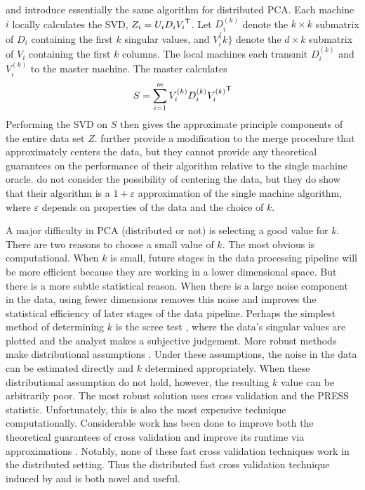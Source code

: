 \documentclass[thesis.tex]{subfiles}
\begin{document}
\cite{qu2002principal} and \cite{liang2013distributed} introduce essentially the same algorithm for distributed PCA.
Each machine $i$ locally calculates the SVD, $Z_i = U_i D_i {V_i}^{\mathsf{T}}$.
Let $D_i^{(k)}$ denote the $k\times k$ submatrix of $D_i$ containing the first $k$ singular values,
and $V_i^\{k\}$ denote the $d\times k$ submatrix of $V_i$ containing the first $k$ columns.
The local machines each transmit $D_i^{(k)}$ and $V_i^{(k)}$ to the master machine.
The master calculates 
\begin{equation}
    S = \sum_{i=1}^m V_i^{(k)}D_i^{(k)}{V_i^{(k)}}^{\mathsf{T}}
\end{equation}
Performing the SVD on $S$ then gives the approximate principle components of the entire data set $Z$.
\cite{qu2002principal} further provide a modification to the merge procedure that approximately centers the data,
but they cannot provide any theoretical guarantees on the performance of their algorithm relative to the single machine oracle.
\cite{liang2013distributed} do not consider the possibility of centering the data,
but they do show that their algorithm is a $1+\varepsilon$ approximation of the single machine algorithm, where $\varepsilon$ depends on properties of the data and the choice of $k$.

A major difficulty in PCA (distributed or not) is selecting a good value for $k$.
There are two reasons to choose a small value of $k$.
The most obvious is computational.
When $k$ is small, future stages in the data processing pipeline will be more efficient because they are working in a lower dimensional space.
But there is a more subtle statistical reason.
When there is a large noise component in the data,
using fewer dimensions removes this noise and improves the statistical efficiency of later stages of the data pipeline.
Perhaps the simplest method of determining $k$ is the scree test \citep{cattell1966scree},
where the data's singular values are plotted and the analyst makes a subjective judgement.
More robust methods make distributional assumptions \citep{bartlett1950tests}.
Under these assumptions, the noise in the data can be estimated directly and $k$ determined appropriately.
When these distributional assumption do not hold, however, the resulting $k$ value can be arbitrarily poor.
The most robust solution uses cross validation and the PRESS statistic.
Unfortunately, this is also the most expensive technique computationally.
Considerable work has been done to improve both the theoretical guarantees of cross validation and improve its runtime via approximations
\citep{wold1978cross,eastment1982cross,krzanowski1987cross,mertens1995efficient,diana2002cross,engelen2004fast,josse2012selecting,camacho2012cross}.
Notably, none of these fast cross validation techniques work in the distributed setting.
Thus the distributed fast cross validation technique induced by \cite{qu2002principal} and \cite{liang2013distributed} is both novel and useful.
\end{document}
